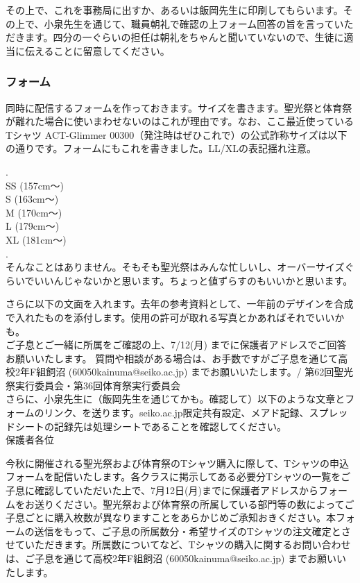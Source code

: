\documentclass[dvipdfmx,jb5]{jreport}
\begin{document}
その上で、これを事務局に出すか、あるいは飯岡先生に印刷してもらいます。その上で、小泉先生を通じて、職員朝礼で確認の上フォーム回答の旨を言っていただきます。四分の一ぐらいの担任は朝礼をちゃんと聞いていないので、生徒に適当に伝えることに留意してください。
\\
\subsubsection{フォーム}
同時に配信するフォームを作っておきます。サイズを書きます。聖光祭と体育祭が離れた場合に使いまわせないのはこれが理由です。なお、ここ最近使っているTシャツ ACT-Glimmer 00300（発注時はぜひこれで）の公式詐称サイズは以下の通りです。フォームにもこれを書きました。LL/XLの表記揺れ注意。

.\\
SS (157cm〜)\\
S (163cm〜)\\
M (170cm〜)\\
L (179cm〜)\\
XL (181cm〜)\\
.
\\

そんなことはありません。そもそも聖光祭はみんな忙しいし、オーバーサイズぐらいでいいんじゃないかと思います。ちょっと値ずらすのもいいかと思います。

さらに以下の文面を入れます。去年の参考資料として、一年前のデザインを合成で入れたものを添付します。使用の許可が取れる写真とかあればそれでいいかも。
\\

ご子息とご一緒に所属をご確認の上、7/12(月) までに保護者アドレスでご回答お願いいたします。
質問や相談がある場合は、お手数ですがご子息を通じて高校2年F組飼沼 (60050kainuma@seiko.ac.jp) までお願いいたします。/ 第62回聖光祭実行委員会・第36回体育祭実行委員会\\

さらに、小泉先生に（飯岡先生を通じてかも。確認して）以下のような文章とフォームのリンク、を送ります。seiko.ac.jp限定共有設定、メアド記録、スプレッドシートの記録先は処理シートであることを確認してください。\\

保護者各位

今秋に開催される聖光祭および体育祭のTシャツ購入に際して、Tシャツの申込フォームを配信いたします。各クラスに掲示してある必要分Tシャツの一覧をご子息に確認していただいた上で、7月12日(月)までに保護者アドレスからフォームをお送りください。聖光祭および体育祭の所属している部門等の数によってご子息ごとに購入枚数が異なりますことをあらかじめご承知おきください。本フォームの送信をもって、ご子息の所属数分・希望サイズのTシャツの注文確定とさせていただきます。所属数についてなど、Tシャツの購入に関するお問い合わせは、ご子息を通じて高校2年F組飼沼 (60050kainuma@seiko.ac.jp) までお願いいたします。
\end{document}
